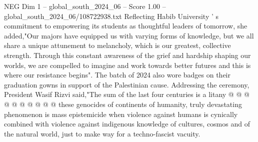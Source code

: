 \begin{textsample}{NEG Dim 1 – global\_south\_2024\_06 – Score 1.00 – global\_south\_2024\_06/108722938.txt}
Reflecting Habib University ' s commitment to empowering its students as thoughtful leaders of tomorrow, she added,"Our majors have equipped us with varying forms of knowledge, but we all share a unique attunement to melancholy, which is our greatest, collective strength.
Through this constant awareness of the grief and hardship shaping our worlds, we are compelled to imagine and work towards better futures and this is where our resistance begins".
The batch of 2024 also wore badges on their graduation gowns in support of the Palestinian cause.
Addressing the ceremony, President Wasif Rizvi said,"The sum of the last four centuries is a litany @ @ @ @ @ @ @ @ @ @ these genocides of continents of humanity, truly devastating phenomenon is mass epistemicide when violence against humans is cynically combined with violence against indigenous knowledge of cultures, cosmos and of the natural world, just to make way for a techno-fascist vacuity.

\end{textsample}
